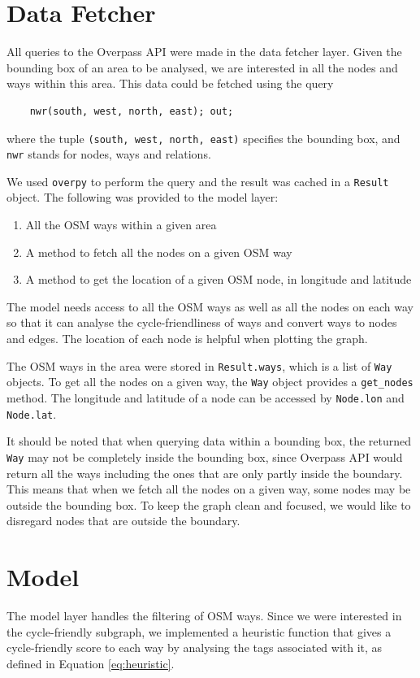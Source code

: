 \documentclass[12pt,a4paper]{report}
\begin{document}
\section{Data Fetcher}
All queries to the Overpass API were made in the data fetcher layer. Given the bounding box of an area to be analysed, we are interested in all the nodes and ways within this area. This data could be fetched using the query
\begin{verbatim}
    nwr(south, west, north, east); out;
\end{verbatim}
where the tuple \texttt{(south, west, north, east)} specifies the bounding box, and \texttt{nwr} stands for nodes, ways and relations.

We used \texttt{overpy} to perform the query and the result was cached in a \texttt{Result} object. The following was provided to the model layer:
\begin{enumerate}
    \item All the OSM ways within a given area
    \item A method to fetch all the nodes on a given OSM way
    \item A method to get the location of a given OSM node, in longitude and latitude
\end{enumerate}

The model needs access to all the OSM ways as well as all the nodes on each way so that it can analyse the cycle-friendliness of ways and convert ways to nodes and edges. The location of each node is helpful when plotting the graph.

The OSM ways in the area were stored in \texttt{Result.ways}, which is a list of \texttt{Way} objects. To get all the nodes on a given way, the \texttt{Way} object provides a \texttt{get\_nodes} method. The longitude and latitude of a node can be accessed by \texttt{Node.lon} and \texttt{Node.lat}.

It should be noted that when querying data within a bounding box, the returned \texttt{Way} may not be completely inside the bounding box, since Overpass API would return all the ways including the ones that are only partly inside the boundary. This means that when we fetch all the nodes on a given way, some nodes may be outside the bounding box. To keep the graph clean and focused, we would like to disregard nodes that are outside the boundary.

\section{Model}
The model layer handles the filtering of OSM ways. Since we were interested in the cycle-friendly subgraph, we implemented a heuristic function that gives a cycle-friendly score to each way by analysing the tags associated with it, as defined in Equation \ref{eq:heuristic}.
\end{document}
